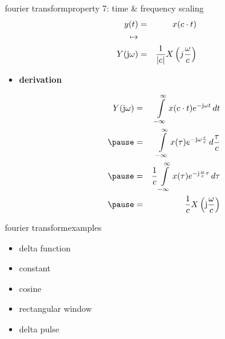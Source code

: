         \begin{frame}{fourier transform}{property 7: time \& frequency scaling}
            \vspace{-3mm}
            \begin{eqnarray*}
                y(t) &=& x(c\cdot t)\\ \mapsto&&\\ Y(\mathrm{j}\omega) &=& \frac{1}{|c|}X\left(j\frac{\omega}{c}\right) 
            \end{eqnarray*}
            \pause
            \begin{itemize}
                \item[]	\textbf{derivation}
                \begin{footnotesize}
                    \begin{eqnarray*}
                        Y(\jom) &=& \int\limits_{-\infty}^{\infty} {x(c\cdot t) \e^{-\jom t}\, dt}\nonumber\\
                        \pause
                        &=& \int\limits_{-\infty}^{\infty} {x(\tau) \e^{-\jom \frac{\tau}{c}}\, d\frac{\tau}{c}}\nonumber\\
                        \pause
                        &=& \frac{1}{c}\int\limits_{-\infty}^{\infty} {x(\tau) \e^{-\mathrm{j} \frac{\omega}{c} \tau}\, d\tau}\nonumber\\
                        \pause
                        &=& \frac{1}{c} X\left(\mathrm{j}\frac{\omega}{c}\right) \nonumber
                    \end{eqnarray*}
                \end{footnotesize}
            \end{itemize}
        \end{frame}	

        \begin{frame}{fourier transform}{examples}
                \begin{itemize}
                    \item	delta function
                    \item	constant
                    \item	cosine
                    \item	rectangular window
                    \item	delta pulse
                \end{itemize}
        \end{frame}	

